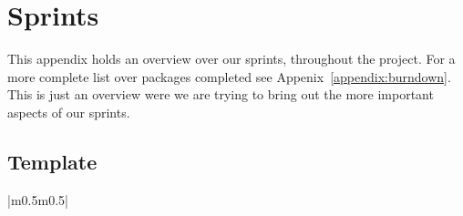 \chapter{Sprints}
\label{chap:sprints}

This appendix holds an overview over our sprints, throughout the
project. For a more complete list over packages completed see Appenix~\ref{appendix:burndown}.
This is just an overview were we are trying to bring out the more
important aspects of our sprints. 

\section{Template}
\begin{center}
\begin{supertabular}{|m{0.5\textwidth}m{0.5\textwidth}|}
\\\hline
{}\\\hline
{}\\\hline
{}\\\hline
{}\\\hline
\end{supertabular}
\end{center}
\clearpage

